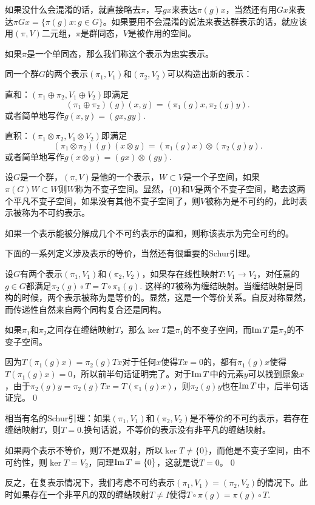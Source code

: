如果没什么会混淆的话，就直接略去$\pi$，写$gx$来表达$\pi(g)x$，当然还有用$Gx$来表达$\pi{G}x=\{\pi(g)x:g\in G\}$。如果要用不会混淆的说法来表达群表示的话，就应该用$(\pi,V)$二元组，$\pi$是群同态，$V$是被作用的空间。

如果$\pi$是一个单同态，那么我们称这个表示为忠实表示。

\para 同一个群$G$的两个表示$(\pi_1,V_1)$和$(\pi_2,V_2)$可以构造出新的表示：

 直和：$(\pi_1\oplus \pi_2,V_1\oplus V_2)$即满足
\[
	(\pi_1\oplus \pi_2)(g)(x,y)=(\pi_1(g)x,\pi_2(g)y).
\]
或者简单地写作$g(x,y)=(gx,gy)$.

 直积：$(\pi_1\otimes \pi_2,V_1\otimes V_2)$即满足
\[
	(\pi_1\otimes \pi_2)(g)(x\otimes y)=(\pi_1(g)x)\otimes (\pi_2(g)y).
\]
或者简单地写作$g(x\otimes y)=(gx)\otimes(gy)$.

\para 设$G$是一个群，$(\pi,V)$是他的一个表示，$W\subset V$是一个子空间，如果$\pi(G)W\subset W$则$W$称为不变子空间。显然，$\{0\}$和$V$是两个不变子空间，略去这两个平凡不变子空间，如果没有其他不变子空间了，则$V$被称为是不可约的，此时表示被称为不可约表示。

\para 如果一个表示能被分解成几个不可约表示的直和，则称该表示为完全可约的。

下面的一系列定义涉及表示的等价，当然还有很重要的Schur引理。

\para 设$G$有两个表示$(\pi_1,V_1)$和$(\pi_2,V_2)$，如果存在线性映射$T:V_1\to V_2$，对任意的$g\in G$都满足$\pi_2(g)\circ T=T\circ \pi_1(g)$. 这样的$T$被称为缠结映射。当缠结映射是同构的时候，两个表示被称为是等价的。显然，这是一个等价关系。自反对称显然，而传递性自然来自两个同构复合还是同构。

\lem 如果$\pi_1$和$\pi_2$之间存在缠结映射$T$，那么$\ker T$是$\pi_1$的不变子空间，而$\operatorname{Im} T$是$\pi_2$的不变子空间。

\proof 因为$T(\pi_1(g)x)=\pi_2(g)Tx$对于任何$x$使得$Tx=0$的，都有$\pi_1(g)x$使得$T(\pi_1(g)x)=0$，所以前半句话证明完了。对于$\operatorname{Im} T$中的元素$y$可以找到原象$x$，由于$\pi_2(g)y=\pi_2(g)Tx=T(\pi_1(g)x)$，则$\pi_2(g)y$也在$\operatorname{Im} T$中，后半句话证完。\qed

\lem 相当有名的Schur引理：如果$(\pi_1,V_1)$和$(\pi_2,V_2)$是不等价的不可约表示，若存在缠结映射$T$，则$T=0$.换句话说，不等价的表示没有非平凡的缠结映射。

\proof 如果两个表示不等价，则$T$不是双射，所以$\ker T\neq \{0\}$，而他是不变子空间，由不可约性，则$\ker T= V_2$，同理$\operatorname{Im}  T= \{0\}$，这就是说$T=0$。\qed

\para 反之，在复表示情况下，我们考虑不可约表示$(\pi_1,V_1)=(\pi_2,V_2)$的情况下。此时如果存在一个非平凡的双的缠结映射$T\neq I$使得$T\circ \pi(g)=\pi(g)\circ T$.

